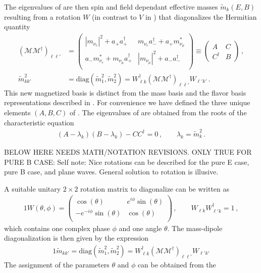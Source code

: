 The eigenvalues of  are then spin and field dependant effective masses $\widetilde{m}_{k}(E,B)$ resulting from a rotation $W$ (in contrast to $V$ in ) that diagonalizes the Hermitian quantity 
\begin{align}
    \label{herm:1}
    \left(\mathcal{M}\mathcal{M}^{\dag}\right)_{\ell\ell'}&=
    \begin{pmatrix}
        |m_{\nu_{e}}|^{2}+a_{+}a_{+}^{\dag} & m_{\nu_{e}}a_{-}^{\dag}+a_{+}m_{\nu_{\mu}}^{*}\\
        a_{-}m_{\nu_{e}}^{*}+m_{\nu_{\mu}}a_{+}^{\dag} & |m_{\nu_{\mu}}|^{2}+a_{-}a_{-}^{\dag}\\
    \end{pmatrix}\equiv
    \begin{pmatrix}
        A & C\\
        C^{\dag} & B
    \end{pmatrix}\,,\\
    \label{herm:2}
    \widetilde{m}^{2}_{kk'}&= \mathrm{diag}(\widetilde{m}_{1}^{2},\widetilde{m}_{2}^{2})=W_{\ell k}^{\dag}\left(\mathcal{M}\mathcal{M}^{\dag}\right)_{\ell\ell'}W_{\ell'k'}\,.
\end{align}
This new magnetized basis is distinct from the mass basis and the flavor basis representations described in . For convenience we have defined the three unique elements $(A,B,C)$ of . The eigenvalues of  are obtained from the roots of the characteristic equation
\begin{align}
    \label{secular:1}
    (A-\lambda_{k})(B-\lambda_{k})-CC^{\dag}=0\,,\qquad
    \lambda_{k}=\widetilde m_{k}^{2}\,.
\end{align}





BELOW HERE NEEDS MATH/NOTATION REVISIONS. ONLY TRUE FOR PURE B CASE: Self note: Nice rotations can be described for the pure E case, pure B case, and plane waves. General solution to rotation is illusive.

A suitable unitary $2\times2$ rotation matrix to diagonalize  can be written as
\begin{alignat}{1}
	\label{mix:4} W(\theta,\phi) = 
    \left(
    \begin{array}{cc}
         \cos (\theta ) & e^{i \phi } \sin (\theta ) \\
         -e^{-i \phi } \sin (\theta ) & \cos (\theta ) \\
    \end{array}
    \right)\,,\qquad
    W_{\ell k}W^{\dag}_{\ell' k} = 1\,,
\end{alignat}
which contains one complex phase $\phi$ and one angle $\theta$. The mass-dipole diagonalization is then given by the expression
\begin{alignat}{1}
	\label{mix:5} \widetilde{m}_{kk'} = \mathrm{diag}(\widetilde{m}_{1}^{2},\widetilde{m}_{2}^{2})=W_{\ell k}^{\dag}\left(\mathcal{M}\mathcal{M}^{\dag}\right)_{\ell\ell'}W_{\ell'k'}
\end{alignat}
The assignment of the parameters $\theta$ and $\phi$ can be obtained from the

